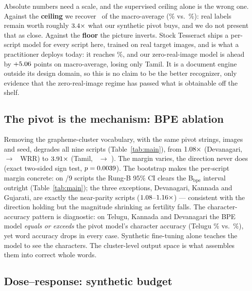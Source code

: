 Absolute numbers need a scale, and the supervised ceiling alone is the wrong one. Against the
\textbf{ceiling} we recover \oursOverCeiling\ of the macro-average (\wrrBmean\% vs.\
\parseqMean\%): real labels remain worth roughly $3.4\times$ what our synthetic pivot
buys, and we do not present that as close. Against the \textbf{floor} the picture inverts. Stock
Tesseract ships a per-script model for every script here, trained on real target images, and is
what a practitioner deploys today: it reaches \tessMean\%,
and our zero-real-image model is ahead by $+5.06$ points on macro-average, losing only
Tamil. It is a document engine outside its design domain, so this is no claim to be the better
recognizer, only evidence that the zero-real-image regime has passed what is obtainable off the
shelf.

\subsection{The pivot is the mechanism: BPE ablation}
\label{sec:ablation}

Removing the grapheme-cluster vocabulary, with the same pivot strings, images and seed,
degrades all nine scripts (Table~\ref{tab:main}), from $1.08\times$ (Devanagari,
\wrrBdevanagari\ $\rightarrow$ \wrrPdevanagari\ WRR) to $3.91\times$ (Tamil,
\wrrBtamil\ $\rightarrow$ \wrrPtamil). The margin varies, the direction never does (exact
two-sided sign test, $p=0.0039$). The bootstrap makes the per-script margin concrete: on
\bpeCIdisjoint/9 scripts the Rung-B 95\% CI clears the B$_{\mathrm{bpe}}$ interval outright
(Table~\ref{tab:main}); the three exceptions, Devanagari, Kannada and Gujarati, are exactly the
near-parity scripts ($1.08$--$1.16\times$) --- consistent with the direction holding but the
magnitude shrinking as fertility falls. The character-accuracy pattern is diagnostic: on Telugu,
Kannada and Devanagari the BPE model \emph{equals or exceeds} the pivot model's character accuracy
(Telugu \chaPtelugu\% vs.\ \chaBtelugu\%), yet word accuracy drops in every case. Synthetic fine-tuning alone teaches the model to see the characters. The
cluster-level output space is what assembles them into correct whole words.

\subsection{Dose--response: synthetic budget}
\label{sec:scaling}

